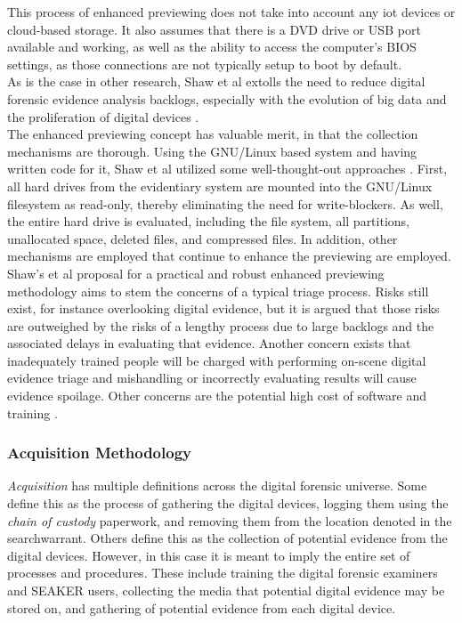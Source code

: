 \documentclass[12pt]{article}
\begin{document}
This process of enhanced previewing does not take into account any \gls{iot} devices or 
cloud-based storage. It also assumes that there is a DVD drive or USB port available and
working, as well as the ability to access the computer's BIOS settings, as those
connections are not typically setup to boot by default.\\

As is the case in other research, Shaw et al extolls the need to reduce digital
forensic evidence analysis backlogs, especially with the evolution of big data and
the proliferation of digital devices \cite{shaw2013practical}.\\

The enhanced previewing concept has valuable merit, in that the collection mechanisms
are thorough.  Using the GNU/Linux based system and having written code for it, Shaw 
et al utilized some well-thought-out approaches \cite{shaw2013practical}.  First, all
hard drives from the evidentiary system are mounted into the GNU/Linux filesystem as
read-only, thereby eliminating the need for write-blockers.  As well, the entire hard
drive is evaluated, including the file system, all partitions, unallocated space,
deleted files, and compressed files.  In addition, other mechanisms are employed that
continue to enhance the previewing are employed.\\

Shaw's et al proposal for a practical and robust enhanced previewing methodology aims to stem
the concerns of a typical triage process.  Risks still exist, for instance overlooking
digital evidence, but it is argued that those risks are outweighed by the risks of a
lengthy process due to large backlogs and the associated delays in evaluating that
evidence.  Another concern exists that inadequately trained people will be charged
with performing on-scene digital evidence triage and mishandling or incorrectly
evaluating results will cause evidence spoilage. Other concerns are the potential high
cost of software and training \cite{shaw2013practical}.\\

\subsubsection{Acquisition Methodology}

{\em Acquisition} has multiple definitions across the digital forensic universe.
Some define this as the process of gathering the digital devices, logging them using the 
{\em chain of custody} paperwork, and removing them from the location denoted in the
\gls{searchwarrant}.  Others define this as the collection of potential evidence from the digital
devices.  However, in this case it is meant to imply the entire set of processes and
procedures.  These include training the digital forensic examiners and SEAKER users, 
collecting the media that potential digital evidence may be stored on, and
gathering of potential evidence from each digital device.\\
\end{document}
